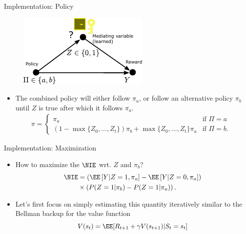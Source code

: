 \begin{frame}{Implementation: Policy}
\begin{figure}
	\centering
	\includegraphics[width=0.7\linewidth]{causal_figures/medanal2}
\end{figure}

	\begin{itemize}
	\item The combined policy will either follow $\pi_a$, or follow an alternative policy $\pi_b$ until $Z$ is true after which it follows $\pi_a$. 
\begin{align*}
	\pi = \begin{cases} \pi_a & \mbox{if $\Pi = a$ } \\ \left(1-\max\{Z_{0}, \dots, Z_t\} \right)\pi_b +\max\{Z_{0}, \dots, Z_t\} \pi_a
		& \mbox{if $\Pi = b$. }\end{cases} %
\end{align*}
	\end{itemize}	
\end{frame}
\begin{frame}{Implementation: Maximization}
\begin{itemize}
	\item How to maximize the $\NIE$ wrt. $Z$ and $\pi_b$?
	\begin{align*}
		\NIE & = \left( \EE\left[Y | Z=1, \pi_a \right] - \EE\left[Y | Z=0, \pi_a \right] \right)  \\  
		& \times  \left( P(Z=1| \pi_b) -P(Z=1| \pi_a) \right).%
	\end{align*} \pause
\item Let's first focus on simply estimating this quantity iteratively similar to the Bellman backup for the value function
$$
V(s_{t} ) = \EE[ R_{t+1} + \gamma V(s_{t+1}) | S_t=s_t]
$$
\end{itemize}
\end{frame}

